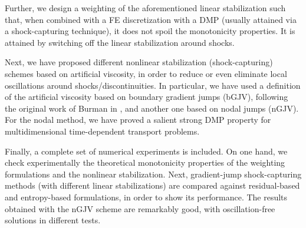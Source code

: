 Further, we design a weighting of the aforementioned linear stabilization such that, 
when combined with a FE discretization with a DMP (usually
attained via a shock-capturing technique), it does not spoil the monotonicity properties. 
It is attained by switching off the linear stabilization around shocks.

Next, we have proposed different nonlinear stabilization (shock-capturing) schemes based on 
artificial viscosity, in order to reduce or even eliminate local oscillations around shocks/discontinuities. 
In particular, we have used a definition of the artificial viscosity based on boundary gradient jumps (bGJV),
following the original work of Burman in \cite{burman_nonlinear_2007}, and another one based on
nodal jumps (nGJV). For the nodal method, we have proved a salient strong DMP property for multidimensional 
time-dependent transport problems.

Finally, a complete set of numerical experiments is included. On one hand, we check experimentally
the theoretical monotonicity properties of the weighting formulations and the nonlinear stabilization. Next, gradient-jump shock-capturing methods (with different linear stabilizations) are compared against residual-based and entropy-based formulations, in order to show its performance. The results obtained with the nGJV scheme are remarkably good, with oscillation-free solutions in different tests.
